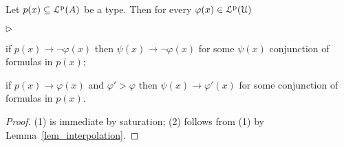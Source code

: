 \documentclass[10pt,oneside]{amsproc}
\newcommand{\mylabel}[1]{{#1}\hfill}
\renewenvironment{itemize}
  {\begin{list}{$\triangleright$}{%
  \setlength{\parskip}{0mm}
  \setlength{\topsep}{.4\baselineskip}
  \setlength{\rightmargin}{0mm}
  \setlength{\listparindent}{0mm}
  \setlength{\itemindent}{0mm}
  \setlength{\labelwidth}{3ex}
  \setlength{\itemsep}{.2\baselineskip}
  \setlength{\parsep}{.2\baselineskip}
  \setlength{\partopsep}{0mm}
  \setlength{\labelsep}{1ex}
  \setlength{\leftmargin}{\labelwidth+\labelsep}
  \let\makelabel\mylabel}}{%
\end{list}}
\def\existsH{\exists}
\begin{document}
\begin{fact}\label{fact_compactness_imp}
  Let $p(x)\subseteq{\EuScript L}^{\rm p}(A)$ be a type.
  Then for every  $\varphi(x)\in{\EuScript L}^{\rm p}({\EuScript U})$
  \begin{itemize}
    \item[1.] if $p(x)\rightarrow\neg\varphi(x)$ then $\psi(x)\rightarrow\neg\varphi(x)$ for some $\psi(x)$ conjunction of formulas in $p(x)$;
    \item[2.] if $p(x)\rightarrow\varphi(x)$ and $\varphi'>\varphi$ then $\psi(x)\rightarrow\varphi'(x)$ for some conjunction of formulas in $p(x)$.
  \end{itemize} 
\end{fact}

\begin{proof}
  (1) is immediate by saturation;  (2) follows from (1) by Lemma~\ref{lem_interpolation}.
\end{proof}



  











\end{document}
